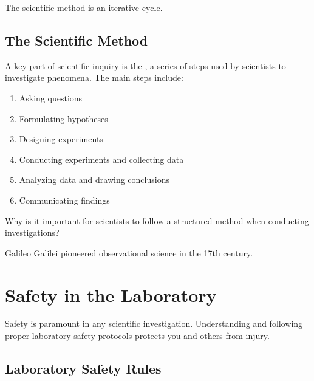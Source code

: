 \begin{marginfigure}
  \caption{The scientific method is an iterative cycle.}
  \label{fig:scientific_method}
\end{marginfigure}

\subsection{The Scientific Method}

A key part of scientific inquiry is the , a series of steps used by scientists to investigate phenomena. The main steps include:

\begin{enumerate}
    \item Asking questions
    \item Formulating hypotheses
    \item Designing experiments
    \item Conducting experiments and collecting data
    \item Analyzing data and drawing conclusions
    \item Communicating findings
\end{enumerate}

\begin{stopandthink}
Why is it important for scientists to follow a structured method when conducting investigations?
\end{stopandthink}

\begin{marginfigure}
  \caption{Galileo Galilei pioneered observational science in the 17th century.}
  \label{fig:galileo}
\end{marginfigure}


\section{Safety in the Laboratory}

Safety is paramount in any scientific investigation. Understanding and following proper laboratory safety protocols protects you and others from injury.

\subsection{Laboratory Safety Rules}

